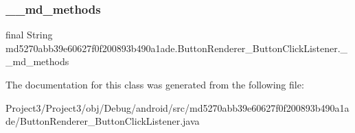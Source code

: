 \subsubsection{\texorpdfstring{\+\_\+\+\_\+md\+\_\+methods}{\_\_md\_methods}}
{\footnotesize\ttfamily final String md5270abb39e60627f0f200893b490a1ade.\+Button\+Renderer\+\_\+\+Button\+Click\+Listener.\+\_\+\+\_\+md\+\_\+methods\hspace{0.3cm}{\ttfamily [static]}}



The documentation for this class was generated from the following file\+:\begin{DoxyCompactItemize}
\item 
Project3/\+Project3/obj/\+Debug/android/src/md5270abb39e60627f0f200893b490a1ade/Button\+Renderer\+\_\+\+Button\+Click\+Listener.\+java\end{DoxyCompactItemize}
